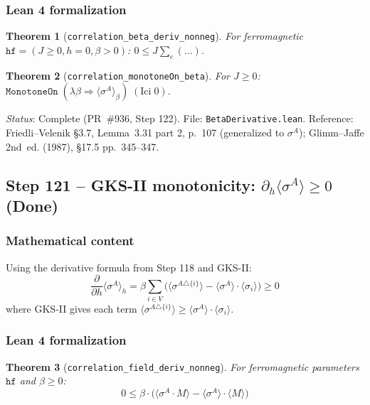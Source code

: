 \documentclass[a4paper,11pt]{article}
\newtheorem{theorem}{Theorem}
\begin{document}
\subsubsection*{Lean 4 formalization}

\begin{theorem}[\texttt{correlation\_beta\_deriv\_nonneg}]
For ferromagnetic $\mathtt{hf} = (J \geq 0, h = 0, \beta > 0)$: $0 \leq J\sum_e(\ldots)$.
\end{theorem}

\begin{theorem}[\texttt{correlation\_monotoneOn\_beta}]
For $J \geq 0$: $\mathtt{MonotoneOn}\;(\lambda\beta \Rightarrow \langle\sigma^A\rangle_\beta)\;(\mathrm{Ici}\;0)$.
\end{theorem}

\noindent\textit{Status}: Complete (PR~\#936, Step 122).
File: \texttt{BetaDerivative.lean}.
Reference: Friedli--Velenik \S3.7, Lemma~3.31 part 2, p.~107 (generalized to $\sigma^A$);
Glimm--Jaffe 2nd~ed. (1987), \S17.5 pp.~345--347.

\subsection*{Step 121 -- GKS-II monotonicity: $\partial_h \langle \sigma^A \rangle \geq 0$ (Done)}

\subsubsection*{Mathematical content}

Using the derivative formula from Step 118 and GKS-II:
\[
  \frac{\partial}{\partial h} \langle \sigma^A \rangle_h
  = \beta \sum_{i \in V} \bigl(
    \langle \sigma^{A \triangle \{i\}} \rangle - \langle \sigma^A \rangle \cdot \langle \sigma_i \rangle
  \bigr) \geq 0
\]
where GKS-II gives each term $\langle \sigma^{A \triangle \{i\}} \rangle \geq \langle \sigma^A \rangle \cdot \langle \sigma_i \rangle$.

\subsubsection*{Lean 4 formalization}

\begin{theorem}[\texttt{correlation\_field\_deriv\_nonneg}]
For ferromagnetic parameters $\mathtt{hf}$ and $\beta \geq 0$:
\[
  0 \leq \beta \cdot \bigl(
    \langle \sigma^A \cdot M \rangle - \langle \sigma^A \rangle \cdot \langle M \rangle
  \bigr)
\]
\end{theorem}
\end{document}
